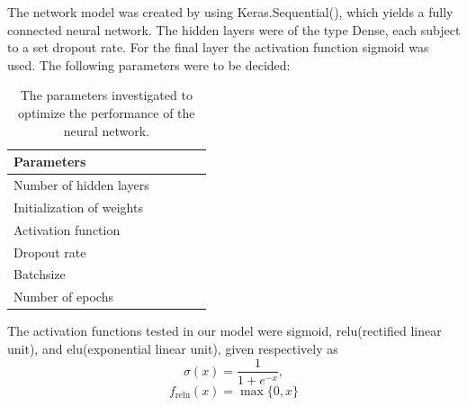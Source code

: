 \documentclass[prl,twocolumn]{revtex4-1}
\begin{document}
The network model was created by using Keras.Sequential(), which yields a fully connected neural network. The hidden layers were of the type Dense, each subject to a set dropout rate. For the final layer the activation function sigmoid was used. The following parameters were to be decided:

\begin{table}[!h]
\begin{center}
\begin{tabular}{lllll}
\hline
Parameters\\
\hline
Number of hidden layers\\
Initialization of weights\\
Activation function\\
Dropout rate\\
Batchsize\\
Number of epochs\\
\hline
\end{tabular}
\end{center}
\caption{The parameters investigated to optimize the performance of the neural network.}
\label{tab:grid_search_training}
\end{table}




The activation functions tested in our model were sigmoid, relu(rectified linear unit), and elu(exponential linear unit), given respectively as
\begin{equation}
    \sigma(x) = \frac{1}{1+e^{-x}},
    \label{eq:sigmoid}
\end{equation}
\begin{equation}
    f_\textrm{relu}(x) = \max \{0,x\}
    \label{eq:relu}
\end{equation}
\end{document}
